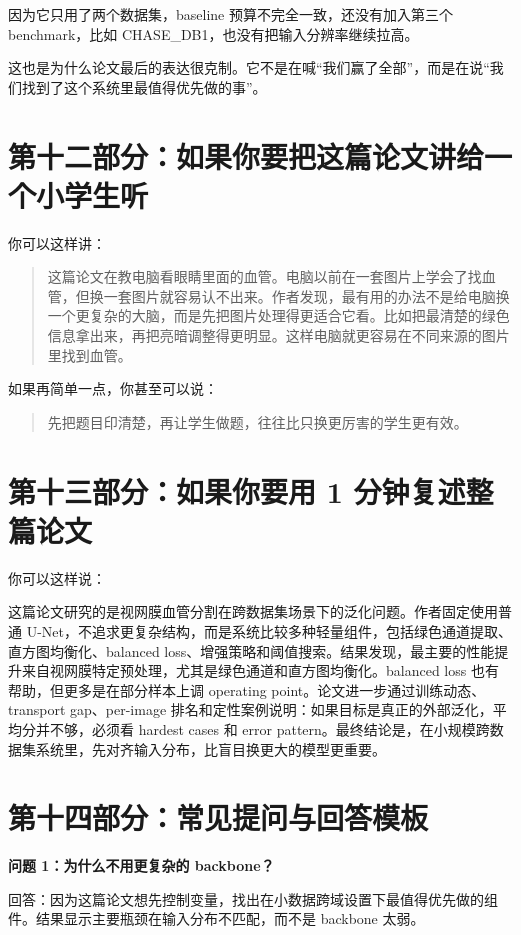 \documentclass[12pt,a4paper]{ctexart}
\begin{document}
因为它只用了两个数据集，baseline 预算不完全一致，还没有加入第三个 benchmark，比如 CHASE\_DB1，也没有把输入分辨率继续拉高。

这也是为什么论文最后的表达很克制。它不是在喊“我们赢了全部”，而是在说“我们找到了这个系统里最值得优先做的事”。

\section*{第十二部分：如果你要把这篇论文讲给一个小学生听}

你可以这样讲：

\begin{quote}
这篇论文在教电脑看眼睛里面的血管。电脑以前在一套图片上学会了找血管，但换一套图片就容易认不出来。作者发现，最有用的办法不是给电脑换一个更复杂的大脑，而是先把图片处理得更适合它看。比如把最清楚的绿色信息拿出来，再把亮暗调整得更明显。这样电脑就更容易在不同来源的图片里找到血管。
\end{quote}

如果再简单一点，你甚至可以说：

\begin{quote}
先把题目印清楚，再让学生做题，往往比只换更厉害的学生更有效。
\end{quote}

\section*{第十三部分：如果你要用 1 分钟复述整篇论文}

你可以这样说：

这篇论文研究的是视网膜血管分割在跨数据集场景下的泛化问题。作者固定使用普通 U-Net，不追求更复杂结构，而是系统比较多种轻量组件，包括绿色通道提取、直方图均衡化、balanced loss、增强策略和阈值搜索。结果发现，最主要的性能提升来自视网膜特定预处理，尤其是绿色通道和直方图均衡化。balanced loss 也有帮助，但更多是在部分样本上调 operating point。论文进一步通过训练动态、transport gap、per-image 排名和定性案例说明：如果目标是真正的外部泛化，平均分并不够，必须看 hardest cases 和 error pattern。最终结论是，在小规模跨数据集系统里，先对齐输入分布，比盲目换更大的模型更重要。

\section*{第十四部分：常见提问与回答模板}

\textbf{问题 1：为什么不用更复杂的 backbone？}

回答：因为这篇论文想先控制变量，找出在小数据跨域设置下最值得优先做的组件。结果显示主要瓶颈在输入分布不匹配，而不是 backbone 太弱。
\end{document}
